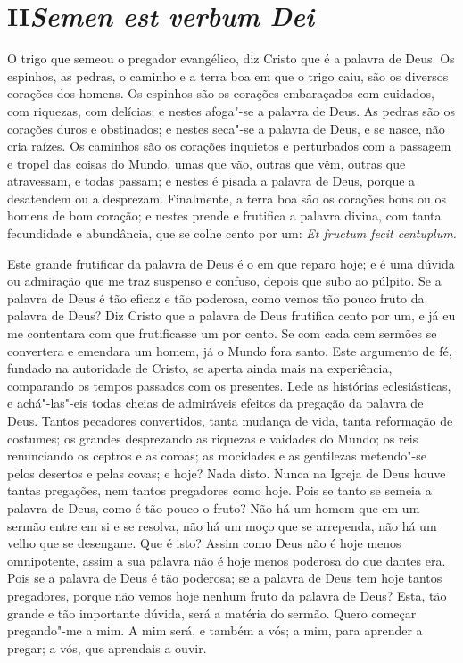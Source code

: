 \section*{II\break\textit{Semen est verbum Dei}}


O trigo que semeou o pregador evangélico, diz Cristo que é a palavra
de Deus. Os espinhos, as pedras, o caminho e a terra boa em que o trigo
caiu, são os diversos corações dos homens. Os espinhos são os corações
embaraçados com cuidados, com riquezas, com delícias; e nestes
afoga"-se a palavra de Deus. As pedras são os corações duros e
obstinados; e nestes seca"-se a palavra de Deus, e se nasce, não cria
raízes. Os caminhos são os corações inquietos e perturbados com a
passagem e tropel das coisas do Mundo, umas que vão, outras que vêm,
outras que atravessam, e todas passam; e nestes é pisada a palavra de
Deus, porque a desatendem ou a desprezam. Finalmente, a terra boa são
os corações bons ou os homens de bom coração; e nestes prende e
frutifica a palavra divina, com tanta fecundidade e abundância, que se
colhe cento por um: \emph{Et fructum fecit centuplum.}

Este grande frutificar da palavra de Deus é o em que reparo hoje; e é
uma dúvida ou admiração que me traz suspenso e confuso, depois que
subo ao púlpito. Se a palavra de Deus é tão eficaz e tão poderosa, como
vemos tão pouco fruto da palavra de Deus? Diz Cristo que a palavra de
Deus frutifica cento por um, e já eu me contentara com que frutificasse
um por cento. Se com cada cem sermões se convertera e emendara um homem,
já o Mundo fora santo. Este argumento de fé, fundado na autoridade de
Cristo, se
aperta ainda mais na experiência, comparando os tempos passados com os
presentes. Lede as histórias eclesiásticas, e achá"-las"-eis todas cheias
de admiráveis efeitos da pregação da palavra de Deus. Tantos pecadores
convertidos, tanta mudança de vida, tanta reformação de costumes; os
grandes desprezando as riquezas e vaidades do Mundo; os reis renunciando
os ceptros e as coroas; as mocidades e as gentilezas metendo"-se pelos
desertos e pelas covas; e hoje? Nada disto. Nunca na Igreja de Deus
houve tantas pregações, nem tantos pregadores como hoje. Pois se tanto
se semeia a palavra de Deus, como é tão pouco o fruto? Não há um homem
que em um sermão entre em si e se resolva, não há um moço que se
arrependa, não há um velho que se desengane. Que é isto? Assim como Deus
não é hoje menos omnipotente, assim a sua palavra não é hoje menos
poderosa do que dantes era. Pois se a palavra de Deus é tão poderosa; se
a palavra de Deus tem hoje tantos pregadores, porque não vemos hoje
nenhum fruto da palavra de Deus? Esta, tão grande e tão importante
dúvida, será a matéria do sermão. Quero começar pregando"-me a mim. A mim
será, e também a vós; a mim, para aprender a pregar; a vós, que
aprendais a ouvir.

